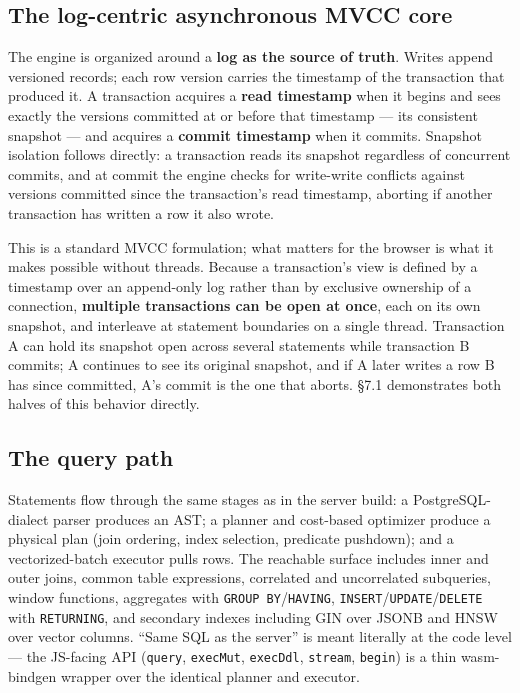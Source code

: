 \documentclass[11pt]{article}
\begin{document}
\subsection{The log-centric asynchronous MVCC core}

The engine is organized around a \textbf{log as the source of truth}. Writes append
versioned records; each row version carries the timestamp of the transaction that
produced it. A transaction acquires a \textbf{read timestamp} when it begins and
sees exactly the versions committed at or before that timestamp --- its consistent
snapshot --- and acquires a \textbf{commit timestamp} when it commits. Snapshot
isolation follows directly: a transaction reads its snapshot regardless of
concurrent commits, and at commit the engine checks for write-write conflicts
against versions committed since the transaction's read timestamp, aborting if
another transaction has written a row it also wrote.

This is a standard MVCC formulation; what matters for the browser is what it makes
possible without threads. Because a transaction's view is defined by a timestamp
over an append-only log rather than by exclusive ownership of a connection,
\textbf{multiple transactions can be open at once}, each on its own snapshot, and
interleave at statement boundaries on a single thread. Transaction A can hold its
snapshot open across several statements while transaction B commits; A continues to
see its original snapshot, and if A later writes a row B has since committed, A's
commit is the one that aborts. \S7.1 demonstrates both halves of this behavior
directly.

\subsection{The query path}

Statements flow through the same stages as in the server build: a
PostgreSQL-dialect parser produces an AST; a planner and cost-based optimizer
produce a physical plan (join ordering, index selection, predicate pushdown); and a
vectorized-batch executor pulls rows. The reachable surface includes inner and
outer joins, common table expressions, correlated and uncorrelated subqueries,
window functions, aggregates with \texttt{GROUP BY}/\texttt{HAVING},
\texttt{INSERT}/\texttt{UPDATE}/\texttt{DELETE} with \texttt{RETURNING}, and
secondary indexes including GIN over JSONB and HNSW over vector columns. ``Same SQL
as the server'' is meant literally at the code level --- the JS-facing API
(\texttt{query}, \texttt{execMut}, \texttt{execDdl}, \texttt{stream},
\texttt{begin}) is a thin wasm-bindgen wrapper over the identical planner and
executor.
\end{document}
